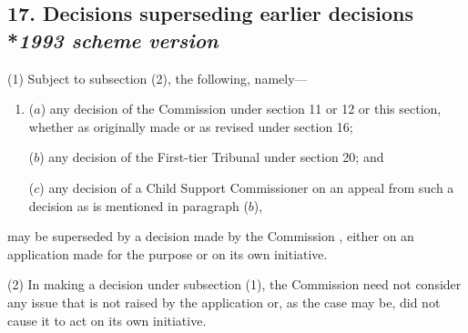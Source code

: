 \documentclass[12pt,a4paper]{article}
\begin{document}
%
%
%
%

\subsection[17. Decisions superseding earlier decisions --- \emph{1993 scheme version}]{17. Decisions superseding earlier decisions\\*\emph{1993 scheme version}}

(1) Subject to subsection (2), the following, namely—
\begin{enumerate}\item[]
($a$) any decision of the 
Commission  %
under section 11 or 12 or this section, whether as originally made or as revised under section 16;

($b$) any decision of 
the First-tier Tribunal  %
under section 20; and

($c$) any decision of a Child Support Commissioner on an appeal from such a decision as is mentioned in paragraph ($b$),
\end{enumerate}
may be superseded by a decision made by the 
Commission%
, either on an application made for the purpose or on 
its  %
own initiative.

(2) In making a decision under subsection (1), the 
Commission  %
need not consider any issue that is not raised by the application or, as the case may be, did not cause 
it  %
to act on 
its  %
own initiative.
\end{document}
